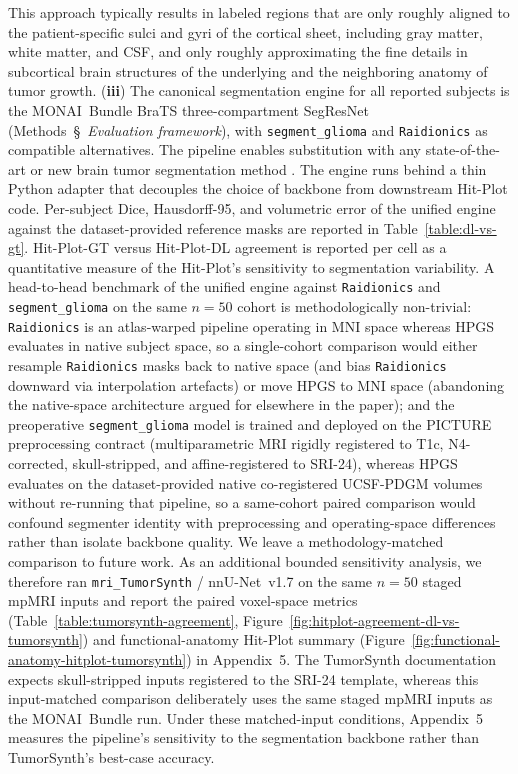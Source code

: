 \documentclass[a4paper,11pt,leqno]{article}
\begin{document}
This approach typically results in
labeled regions that are only roughly aligned to the patient-specific
sulci and gyri of the cortical sheet, including gray matter, white
matter, and CSF, and only roughly approximating the fine details in
subcortical brain structures of
the underlying and the neighboring anatomy of tumor growth.
(\textbf{iii}) The canonical segmentation engine for all reported
subjects is the MONAI~Bundle BraTS three-compartment SegResNet
(Methods~\S~\emph{Evaluation framework}), with \texttt{segment\_glioma}
and \texttt{Raidionics} as compatible alternatives. The pipeline
enables substitution with any state-of-the-art or new brain tumor
segmentation method
\cite{Alam2021, Bouget2023a, Latif2022, Liu2023, Menze2021, Ranjbarzadeh2022, Thomas2022, Tillmanns2022, WuCao2023}.
The engine runs behind a thin Python adapter that decouples the choice of backbone from
downstream Hit-Plot code.
Per-subject Dice, Hausdorff-95, and volumetric error of the unified
engine against the dataset-provided reference masks are reported in Table~\ref{table:dl-vs-gt}. Hit-Plot-GT versus Hit-Plot-DL agreement is reported per cell as a quantitative measure of the
Hit-Plot's sensitivity to segmentation variability. A head-to-head
benchmark of the unified engine against \texttt{Raidionics} and
\texttt{segment\_glioma} on the same $n=50$ cohort is methodologically
non-trivial: \texttt{Raidionics} is an atlas-warped pipeline
operating in MNI space whereas HPGS evaluates in native subject
space, so a single-cohort comparison would either resample
\texttt{Raidionics} masks back to native space (and bias
\texttt{Raidionics} downward via interpolation artefacts) or move
HPGS to MNI space (abandoning the native-space architecture argued
for elsewhere in the paper); and the preoperative
\texttt{segment\_glioma} model is trained and deployed on the PICTURE
preprocessing contract (multiparametric MRI rigidly registered to T1c,
N4-corrected, skull-stripped, and affine-registered to SRI-24), whereas
HPGS evaluates on the dataset-provided native co-registered UCSF-PDGM
volumes without re-running that pipeline, so a same-cohort paired
comparison would confound segmenter identity with preprocessing and
operating-space differences rather than isolate backbone quality. We
leave a methodology-matched comparison to future work. As an
additional bounded sensitivity analysis, we therefore ran
\texttt{mri\_TumorSynth} / nnU-Net~v1.7 on the same $n=50$ staged
mpMRI inputs and report the paired voxel-space metrics
(Table~\ref{table:tumorsynth-agreement}, Figure~\ref{fig:hitplot-agreement-dl-vs-tumorsynth}) and
functional-anatomy Hit-Plot summary (Figure~\ref{fig:functional-anatomy-hitplot-tumorsynth}) in Appendix~5. The TumorSynth
documentation expects skull-stripped inputs registered to the SRI-24
template, whereas this input-matched comparison deliberately uses the
same staged mpMRI inputs as the MONAI~Bundle run. Under these matched-input conditions, Appendix~5 measures the pipeline's sensitivity to the segmentation backbone rather than TumorSynth's best-case accuracy.
\end{document}
